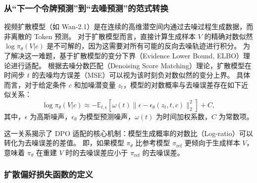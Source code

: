 \subsubsection{从“下一个令牌预测”到“去噪预测”的范式转换}

视频扩散模型（如 Wan-2.1）是在连续的高维潜空间内通过去噪过程生成数据，而非离散的 Token 预测。
对于扩散模型而言，直接计算生成样本 $V$ 的精确对数似然 $\log \pi_\theta(V|c)$ 是不可解的，因为这需要对所有可能的反向去噪轨迹进行积分。
为了解决这一难题，基于扩散模型的变分下界（Evidence Lower Bound, ELBO）理论进行适配。
根据去噪分数匹配（Denoising Score Matching）理论，扩散模型在时间步 $t$ 的去噪均方误差（MSE）可以视为该时刻负对数似然的变分上界。
具体而言，对于给定条件 $c$ 和加噪潜变量 $z_t$，模型的对数概率与去噪误差存在如下近似关系：
\begin{equation}
    \log \pi_\theta(V|c) \approx - \mathbb{E}_{t, \epsilon} \left[ \omega(t) \| \epsilon - \epsilon_\theta(z_t, t, c) \|_2^2 \right] + C,
\end{equation}
其中，$\epsilon$ 为高斯噪声，$\epsilon_\theta$ 为模型预测噪声，$\omega(t)$ 为时间加权系数，$C$ 为常数项。

这一关系揭示了 DPO 适配的核心机制：模型生成概率的对数比（Log-ratio）可以转化为去噪误差的差值。
即，如果模型 $\pi_\theta$ 比参考模型 $\pi_{\text{ref}}$ 更倾向于生成样本 $V$，意味着 $\pi_\theta$ 在重建 $V$ 时的去噪误差应小于 $\pi_{\text{ref}}$ 的去噪误差。

\subsubsection{扩散偏好损失函数的定义}

